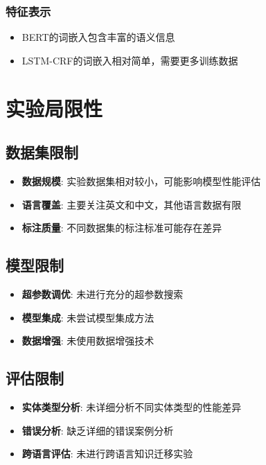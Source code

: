 \documentclass[12pt,a4paper]{article}
\begin{document}
\subsubsection{特征表示}
\begin{itemize}
    \item BERT的词嵌入包含丰富的语义信息
    \item LSTM-CRF的词嵌入相对简单，需要更多训练数据
\end{itemize}

\section{实验局限性}

\subsection{数据集限制}
\begin{itemize}
    \item \textbf{数据规模}: 实验数据集相对较小，可能影响模型性能评估
    \item \textbf{语言覆盖}: 主要关注英文和中文，其他语言数据有限
    \item \textbf{标注质量}: 不同数据集的标注标准可能存在差异
\end{itemize}

\subsection{模型限制}
\begin{itemize}
    \item \textbf{超参数调优}: 未进行充分的超参数搜索
    \item \textbf{模型集成}: 未尝试模型集成方法
    \item \textbf{数据增强}: 未使用数据增强技术
\end{itemize}

\subsection{评估限制}
\begin{itemize}
    \item \textbf{实体类型分析}: 未详细分析不同实体类型的性能差异
    \item \textbf{错误分析}: 缺乏详细的错误案例分析
    \item \textbf{跨语言评估}: 未进行跨语言知识迁移实验
\end{itemize}
\end{document}
